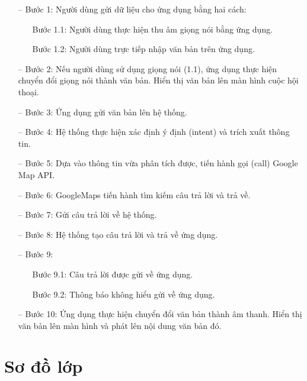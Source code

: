 \begin{itemize}
    \item[--] Bước 1: Người dùng gửi dữ liệu cho ứng dụng bằng hai cách:
    \begin{itemize}
        \item[\textbullet] Bước 1.1: Người dùng thực hiện thu âm giọng nói bằng ứng dụng.
        \item[\textbullet] Bước 1.2: Người dùng trực tiếp nhập văn bản trên ứng dụng.
    \end{itemize} 
    \item[--] Bước 2: Nếu người dùng sử dụng giọng nói (1.1), ứng dụng thực hiện chuyển đổi giọng nói thành văn bản. Hiển thị văn bản lên màn hình cuộc hội thoại.
    \item[--] Bước 3: Ứng dụng gửi văn bản lên hệ thống. 
    \item[--] Bước 4: Hệ thống thực hiện xác định ý định (intent) và trích xuất thông tin. 
    \item[--] Bước 5: Dựa vào thông tin vừa phân tích được, tiến hành gọi (call) Google Map API.
    \item[--] Bước 6: GoogleMaps tiến hành tìm kiếm câu trả lời và trả về.
    \item[--] Bước 7: Gửi câu trả lời về hệ thống.
    \item[--] Bước 8: Hệ thống tạo câu trả lời và trả về ứng dụng. 
    \item[--] Bước 9:  
    \begin{itemize}
        \item[\textbullet] Bước 9.1: Câu trả lời được gửi về ứng dụng.
        \item[\textbullet] Bước 9.2: Thông báo không hiểu gửi về ứng dụng.
    \end{itemize} 
    \item[--] Bước 10: Ứng dụng thực hiện chuyển đổi văn bản thành âm thanh. Hiển thị văn bản lên màn hình và phát lên nội dung văn bản đó.
\end{itemize}

\section{Sơ đồ lớp}
